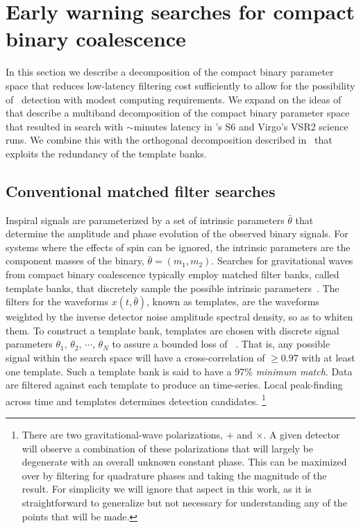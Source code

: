\section{Early warning searches for compact binary coalescence}
\label{SECII}\label{sec:method}

In this section we describe a decomposition of the compact binary parameter
space that reduces low-latency filtering cost sufficiently to allow for the
possibility of \earlywarning\ detection with modest computing requirements.  We
expand on the ideas of~\cite{Marion2004, Buskulic2010} that describe a
multiband decomposition of the compact binary parameter space that resulted in
search with $\sim$minutes latency in \LIGO{}'s S6 and Virgo's VSR2 science runs.
We combine this with the orthogonal decomposition described
in~\cite{Cannon:2010p10398} that exploits the redundancy of the template banks.

\subsection{Conventional \CBC{} matched filter searches}

Inspiral signals are parameterized by a set of intrinsic parameters
$\bar{\theta}$ that determine the amplitude and phase evolution of the observed
binary signals. For systems where the effects of spin can be ignored, the
intrinsic parameters are the component masses of the binary, $\bar{\theta} =
(m_1, m_2)$. Searches for gravitational waves from compact binary coalescence
typically employ matched filter banks, called template banks, that discretely
sample the possible intrinsic parameters~\cite{findchirppaper}.  The filters
for the waveforms $x(t,\bar{\theta})$, known as templates, are the waveforms
weighted by the inverse detector noise amplitude spectral density, so as to
whiten them. To construct a template bank, templates are chosen with discrete
signal parameters $\theta_1,\, \theta_2,\, \cdots$, $\theta_N$ to assure a
bounded loss of \SNR~\cite{Owen:1995tm,Owen:1998dk}. That is, any possible
signal within the search space will have a cross-correlation of $\geq0.97$ with
at least one template. Such a template bank is said to have a 97\% {\em
minimum match}. Data are filtered against each template to produce an \SNR{}
time-series. Local peak-finding across time and templates determines detection
candidates.
%
\footnote{There are two gravitational-wave polarizations, $+$ and $\times$. A
given detector will observe a combination of these polarizations that will
largely be degenerate with an overall unknown constant phase.  This can be
maximized over by filtering for quadrature phases and taking the magnitude of
the result. For simplicity we will ignore that aspect in this work, as it is
straightforward to generalize but not necessary for understanding any of the
points that will be made.}

